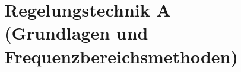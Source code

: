 \newpage%
\thispagestyle{empty}%
\part*{Regelungstechnik A \\(Grundlagen und Frequenzbereichsmethoden)}%
\newpage%
